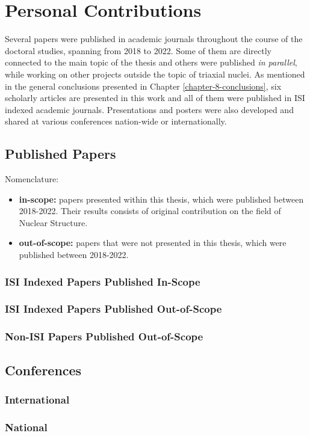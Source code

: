 \chapter{Personal Contributions}
\label{appendix:contributions}

Several papers were published in academic journals throughout the course of the doctoral studies, spanning from 2018 to 2022. Some of them are directly connected to the main topic of the thesis and others were published \emph{in parallel}, while working on other projects outside the topic of triaxial nuclei. As mentioned in the general conclusions presented in Chapter \ref{chapter-8-conclusions}, six scholarly articles are presented in this work and all of them were published in ISI indexed academic journals. Presentations and posters were also developed and shared at various conferences nation-wide or internationally. 

\section{Published Papers}

Nomenclature:
\begin{itemize}
    \item \textbf{in-scope:} papers presented within this thesis, which were published between 2018-2022. Their results consists of original contribution on the field of Nuclear Structure. 
    \item \textbf{out-of-scope:} papers that were not presented in this thesis, which were published between 2018-2022.
\end{itemize}

\subsection{ISI Indexed Papers Published In-Scope}

\subsection{ISI Indexed Papers Published Out-of-Scope}

\subsection{Non-ISI Papers Published Out-of-Scope}

\section{Conferences}

\subsection{International}

\subsection{National}